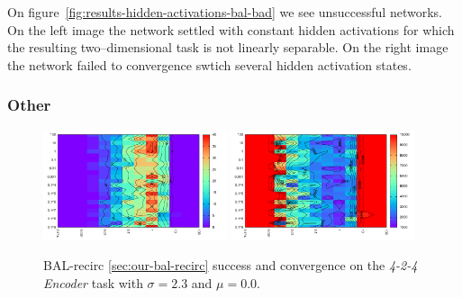 On figure~\ref{fig:results-hidden-activations-bal-bad} we see unsuccessful networks. On the left image the network settled with constant hidden activations for which the resulting two--dimensional task is not linearly separable. On the right image the network failed to convergence swtich several hidden activation states.

\subsubsection{Other} 

\begin{figure}[H]
  \centering
  \includegraphics[width=0.48\textwidth]{img/bal-recirc-auto4-success.pdf}   
  \includegraphics[width=0.48\textwidth]{img/bal-recirc-auto4-epoch.pdf}     
  \caption{BAL-recirc \ref{sec:our-bal-recirc} success and convergence on the \emph{4-2-4 Encoder} task with $\sigma = 2.3$ and $\mu = 0.0$.}
  \label{fig:results-generec-auto4-performance}
\end{figure}


